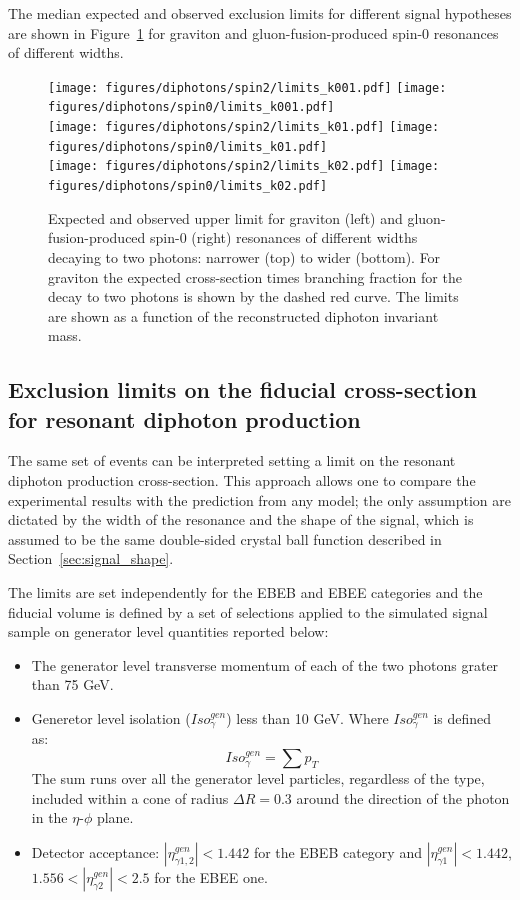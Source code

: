 The median expected and observed exclusion limits for different signal hypotheses are shown in
Figure~\ref{fig:limits} for \RS graviton and gluon-fusion-produced spin-0 resonances of different widths.

\begin{figure}[h!]
  \centering
  \texttt{[image: figures/diphotons/spin2/limits\_k001.pdf]}
  \texttt{[image: figures/diphotons/spin0/limits\_k001.pdf]}\\
  \texttt{[image: figures/diphotons/spin2/limits\_k01.pdf]}
  \texttt{[image: figures/diphotons/spin0/limits\_k01.pdf]}\\
  \texttt{[image: figures/diphotons/spin2/limits\_k02.pdf]}
  \texttt{[image: figures/diphotons/spin0/limits\_k02.pdf]}\\
    \caption{
      Expected and observed upper limit for \RS graviton (left) and gluon-fusion-produced spin-0
      (right) resonances of different widths decaying to two photons:
      narrower (top) to wider (bottom). For \RS graviton the expected cross-section times branching fraction
      for the decay to two photons is shown by the dashed red curve. The limits are shown as a function of
      the reconstructed diphoton invariant mass.
    }
    \label{fig:limits}
\end{figure}

\subsection{Exclusion limits on the fiducial cross-section for resonant diphoton production}
The same set of events can be interpreted setting a limit on the resonant diphoton production cross-section.
This approach allows one to compare the experimental results with the prediction from any model; the
only assumption are dictated by the width of the resonance and the shape of the signal, which is assumed to
be the same double-sided crystal ball function described in Section~\ref{sec:signal_shape}.

The limits are set independently for the EBEB and EBEE categories and the
fiducial volume is defined by a set of selections applied to the simulated signal sample on generator
level quantities reported below:
\begin{itemize}
\item The generator level transverse momentum of each of the two photons grater than 75 GeV.
\item Generetor level isolation ($Iso_{\gamma}^{gen}$) less than 10 GeV. Where $Iso_{\gamma}^{gen}$ is defined as:
  \[
    Iso_{\gamma}^{gen} = \sum p_T
  \]
  The sum runs over all the generator level particles, regardless of the type, included within a cone of radius $\Delta R = 0.3$
  around the direction of the photon in the $\eta$-$\phi$ plane.
\item Detector acceptance: $|\eta_{\gamma 1,2}^{gen}| < 1.442$ for the EBEB category and
  $|\eta_{\gamma 1}^{gen}| < 1.442$, $1.556 < |\eta_{\gamma 2}^{gen}| < 2.5$ for the EBEE one.
\end{itemize}

